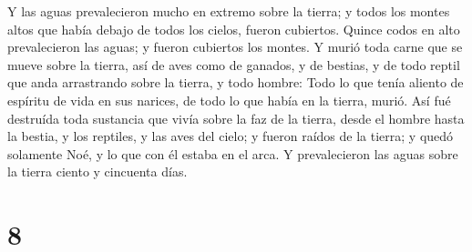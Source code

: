  Y las aguas prevalecieron mucho en extremo sobre la
tierra; y todos los montes altos que había debajo de todos los cielos,
fueron cubiertos.  Quince codos en alto prevalecieron las
aguas; y fueron cubiertos los montes.  Y murió toda carne
que se mueve sobre la tierra, así de aves como de ganados, y de bestias,
y de todo reptil que anda arrastrando sobre la tierra, y todo hombre:
 Todo lo que tenía aliento de espíritu de vida en sus
narices, de todo lo que había en la tierra, murió.  Así fué
destruída toda sustancia que vivía sobre la faz de la tierra, desde el
hombre hasta la bestia, y los reptiles, y las aves del cielo; y fueron
raídos de la tierra; y quedó solamente Noé, y lo que con él estaba en el
arca.  Y prevalecieron las aguas sobre la tierra ciento y
cincuenta días.

\hypertarget{section-7}{%
\section{8}\label{section-7}}


